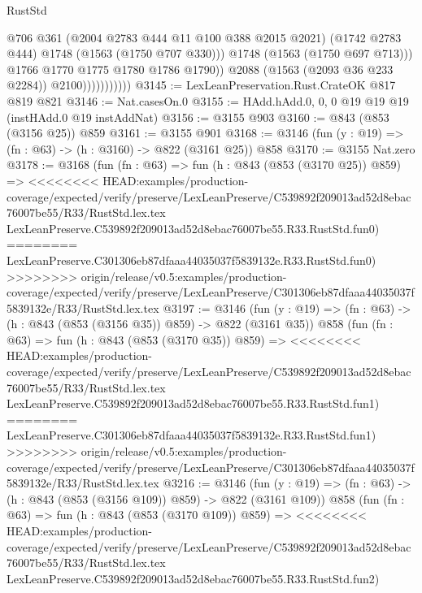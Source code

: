\begin{lexlean}{RustStd}
\begin{coremodule}
{\begin{coremodule}
{{{{{{{{                                  @706
                                  @361
                                  (@2004 @2783 @444 @11 @100 @388 @2015 @2021)
                                  (@1742 @2783 @444)
                                  @1748
                                  (@1563 (@1750 @707 @330)))
                                @1748
                                (@1563 (@1750 @697 @713)))
                              @1766
                              @1770
                              @1775
                              @1780
                              @1786
                              @1790))
                          @2088
                          (@1563 (@2093 @36 @233 @2284))
                          @2100)))))))))))
@3145 := LexLeanPreservation.Rust.CrateOK @817 @819 @821
@3146 := Nat.casesOn.{0}
@3155 := HAdd.hAdd.{0, 0, 0} @19 @19 @19 (instHAdd.{0} @19 instAddNat)
@3156 := @3155 @903
@3160 := @843 (@853 (@3156 @25)) @859
@3161 := @3155 @901
@3168 := @3146 (fun (y : @19) => (fn : @63) -> (h : @3160) -> @822 (@3161 @25)) @858
@3170 := @3155 Nat.zero
@3178 := @3168
    (fun (fn : @63) =>
    fun (h : @843 (@853 (@3170 @25)) @859) =>
<<<<<<<< HEAD:examples/production-coverage/expected/verify/preserve/LexLeanPreserve/C539892f209013ad52d8ebac76007be55/R33/RustStd.lex.tex
    LexLeanPreserve.C539892f209013ad52d8ebac76007be55.R33.RustStd.fun0)
========
    LexLeanPreserve.C301306eb87dfaaa44035037f5839132e.R33.RustStd.fun0)
>>>>>>>> origin/release/v0.5:examples/production-coverage/expected/verify/preserve/LexLeanPreserve/C301306eb87dfaaa44035037f5839132e/R33/RustStd.lex.tex
@3197 := @3146
    (fun (y : @19) => (fn : @63) -> (h : @843 (@853 (@3156 @35)) @859) -> @822 (@3161 @35))
    @858
    (fun (fn : @63) =>
    fun (h : @843 (@853 (@3170 @35)) @859) =>
<<<<<<<< HEAD:examples/production-coverage/expected/verify/preserve/LexLeanPreserve/C539892f209013ad52d8ebac76007be55/R33/RustStd.lex.tex
    LexLeanPreserve.C539892f209013ad52d8ebac76007be55.R33.RustStd.fun1)
========
    LexLeanPreserve.C301306eb87dfaaa44035037f5839132e.R33.RustStd.fun1)
>>>>>>>> origin/release/v0.5:examples/production-coverage/expected/verify/preserve/LexLeanPreserve/C301306eb87dfaaa44035037f5839132e/R33/RustStd.lex.tex
@3216 := @3146
    (fun (y : @19) => (fn : @63) -> (h : @843 (@853 (@3156 @109)) @859) -> @822 (@3161 @109))
    @858
    (fun (fn : @63) =>
    fun (h : @843 (@853 (@3170 @109)) @859) =>
<<<<<<<< HEAD:examples/production-coverage/expected/verify/preserve/LexLeanPreserve/C539892f209013ad52d8ebac76007be55/R33/RustStd.lex.tex
    LexLeanPreserve.C539892f209013ad52d8ebac76007be55.R33.RustStd.fun2)
}}}}}}}}
\end{coremodule}}
\end{coremodule}
\end{lexlean}
